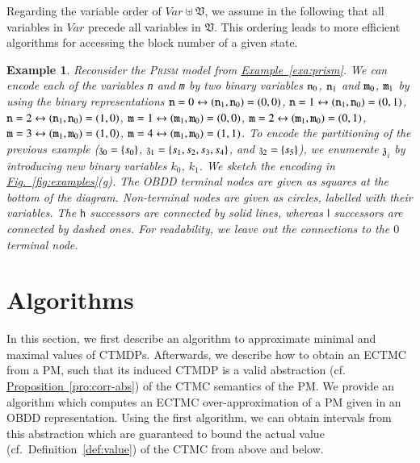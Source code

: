 \documentclass[10pt,twocolumn]{article}
\newtheorem{example}{Example}
\newcommand{\PRISM}{\textsc{Prism}\xspace}
\newcommand{\state}  {{\ensuremath s}}
\newcommand{\avars}{\mathfrak{V}}
\newcommand{\astate}{\mathfrak{z}}
\newcommand{\bddHi}{\mathsf{h}}
\newcommand{\bddLo}{\mathsf{l}}
\newcommand{\prismVars}{\mathit{Var}}
\newcommand{\reffig}[1]{\texorpdfstring{\hyperref[fig:#1]{Fig.~\ref*{fig:#1}}}{Fig.~\ref*{fig:#1}}}
\newcommand{\refpro}[1]{\texorpdfstring{\hyperref[pro:#1]{Proposition~\ref*{pro:#1}}}{Proposition~\ref*{pro:#1}}}
\newcommand{\refexa}[1]{\texorpdfstring{\hyperref[exa:#1]{Example~\ref*{exa:#1}}}{Example~\ref*{exa:#1}}}
\begin{document}
Regarding the variable order of $\prismVars\uplus\avars$, we assume in
the following that all variables in $\prismVars$ precede all variables
in $\avars$. This ordering leads to more efficient algorithms for accessing the
block number of a given state.

\begin{example}
  Reconsider the \PRISM model from \refexa{prism}.
  We can encode each of the variables \texttt{n} and \texttt{m} by two binary variables $\mbox{\texttt{n}}_0$, $\mbox{\texttt{n}}_1$ and $\mbox{\texttt{m}}_0$, $\mbox{\texttt{m}}_1$ by using the binary representations
  $\mbox{\texttt{n}}=0 \leftrightarrow (\mbox{\texttt{n}}_1,\mbox{\texttt{n}}_0)=(0,0)$,
  $\mbox{\texttt{n}}=1 \leftrightarrow (\mbox{\texttt{n}}_1,\mbox{\texttt{n}}_0)=(0,1)$,
  $\mbox{\texttt{n}}=2 \leftrightarrow (\mbox{\texttt{n}}_1,\mbox{\texttt{n}}_0)=(1,0)$,
  $\mbox{\texttt{m}}=1 \leftrightarrow (\mbox{\texttt{m}}_1,\mbox{\texttt{m}}_0)=(0,0)$,
  $\mbox{\texttt{m}}=2 \leftrightarrow (\mbox{\texttt{m}}_1,\mbox{\texttt{m}}_0)=(0,1)$,
  $\mbox{\texttt{m}}=3 \leftrightarrow (\mbox{\texttt{m}}_1,\mbox{\texttt{m}}_0)=(1,0)$,
  $\mbox{\texttt{m}}=4 \leftrightarrow (\mbox{\texttt{m}}_1,\mbox{\texttt{m}}_0)=(1,1)$.
  To encode the partitioning of the previous example ($\astate_0 = \{\state_0\}$, $\astate_1 = \{\state_1, \state_2, \state_3, \state_4\}$, 
  and $\astate_2 = \{\state_5\}$), we enumerate $\astate_i$ by introducing new binary variables $k_0$, $k_1$.
  We sketch the encoding in \reffig{examples}(g).
  The OBDD terminal nodes are given as squares at the bottom of the diagram.
  Non-terminal nodes are given as circles, labelled with their variables.
  The $\bddHi$ successors are connected by solid lines, whereas $\bddLo$ successors are connected by dashed ones.
  For readability, we leave out the connections to the $0$ terminal node.
\end{example}

\section{Algorithms}
\label{sec:algorithms}
\noindent In this section, we first describe an algorithm to
approximate minimal and maximal values of CTMDPs. Afterwards, we
describe how to obtain an ECTMC from a PM, such that its induced CTMDP
is a valid abstraction (cf. \refpro{corr-abs}) of the CTMC semantics
of the PM. We provide an algorithm which computes an ECTMC
over-approximation of a PM given in an OBDD representation. Using the
first algorithm, we can obtain intervals from this abstraction which
are guaranteed to bound the actual value (cf.~Definition~\ref{def:value})
of the CTMC from above and below.
\end{document}
